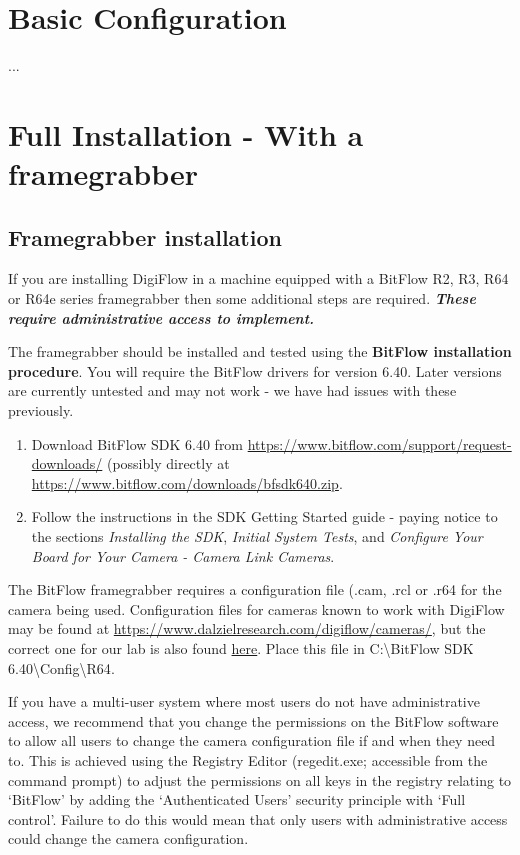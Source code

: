 \documentclass{article}
\newcommand{\Analyse}[1]{\textcolor{mygreen}{#1}}
\newcommand{\Files}[1]{\textcolor{myblue}{#1}}
\begin{document}
\section{Basic Configuration}
...


\section{Full Installation  - With a framegrabber}

\subsection{Framegrabber installation}
If you are installing DigiFlow in a machine equipped with a BitFlow R2, R3, R64 or R64e series framegrabber then some additional steps are required. \textit{\textbf{These require administrative access to implement.}}

The framegrabber should be installed and tested using the \textbf{BitFlow installation procedure}. You will require the BitFlow drivers for version 6.40. Later versions are currently untested and may not work - we have had issues with these previously. 

\begin{enumerate}
    \item Download \Files{BitFlow SDK 6.40} from \url{https://www.bitflow.com/support/request-downloads/} (possibly directly at \url{https://www.bitflow.com/downloads/bfsdk640.zip}. 
    \item Follow the instructions in the SDK Getting Started guide - paying notice to the sections \textit{Installing the SDK}, \textit{Initial System Tests}, and \textit{Configure Your Board for Your Camera - Camera Link Cameras}. 
\end{enumerate}

The BitFlow framegrabber requires a configuration file (\Analyse{.cam, .rcl} or \Analyse{.r64} for the camera being used. Configuration files for cameras known to work with DigiFlow may be found at \url{https://www.dalzielresearch.com/digiflow/cameras/}, but the correct one for our lab is also found \href{https://github.com/HartharnSam/ISWLabToolkit/blob/e48b0b40e41e7221040feb543a087d1a41793f83/Cameras/UniqVision_UP1830CL_8bit.r64}{here}. Place this file in \Analyse{C:\textbackslash BitFlow SDK 6.40\textbackslash Config\textbackslash R64}.

If you have a multi-user system where most users do not have administrative access, we recommend that you change the permissions on the BitFlow software to allow all users to change the camera configuration file if and when they need to. This is achieved using the Registry Editor (regedit.exe; accessible from the command prompt) to adjust the permissions on all keys in the registry relating to ‘BitFlow’ by adding the ‘Authenticated Users’ security principle with ‘Full control’. Failure to do this would mean that only users with administrative access could change the camera configuration.
\end{document}
